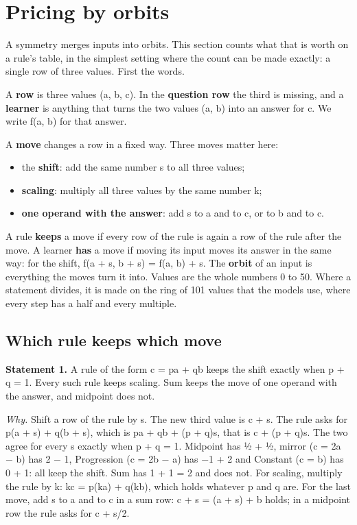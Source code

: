 \section{Pricing by orbits}\label{sec:3.6}

A symmetry merges inputs into orbits. This section counts what that is worth on a rule's table, in the simplest setting where the count can be made exactly: a single row of three values. First the words.

A \textbf{row} is three values (a, b, c). In the \textbf{question row} the third is missing, and a \textbf{learner} is anything that turns the two values (a, b) into an answer for c. We write f(a, b) for that answer.

A \textbf{move} changes a row in a fixed way. Three moves matter here:

\begin{itemize}
\item the \textbf{shift}: add the same number s to all three values;
\item \textbf{scaling}: multiply all three values by the same number k;
\item \textbf{one operand with the answer}: add s to a and to c, or to b and to c.
\end{itemize}

A rule \textbf{keeps} a move if every row of the rule is again a row of the rule after the move. A learner \textbf{has} a move if moving its input moves its answer in the same way: for the shift, f(a + s, b + s) = f(a, b) + s. The \textbf{orbit} of an input is everything the moves turn it into. Values are the whole numbers 0 to 50. Where a statement divides, it is made on the ring of 101 values that the models use, where every step has a half and every multiple.

\subsection{Which rule keeps which move}\label{sec:3.6.1}

\textbf{Statement 1.} A rule of the form c = pa + qb keeps the shift exactly when p + q = 1. Every such rule keeps scaling. Sum keeps the move of one operand with the answer, and midpoint does not.

\emph{Why.} Shift a row of the rule by s. The new third value is c + s. The rule asks for p(a + s) + q(b + s), which is pa + qb + (p + q)s, that is c + (p + q)s. The two agree for every s exactly when p + q = 1. Midpoint has ½ + ½, mirror (c = 2a − b) has 2 − 1, Progression (c = 2b − a) has −1 + 2 and Constant (c = b) has 0 + 1: all keep the shift. Sum has 1 + 1 = 2 and does not. For scaling, multiply the rule by k: kc = p(ka) + q(kb), which holds whatever p and q are. For the last move, add s to a and to c in a sum row: c + s = (a + s) + b holds; in a midpoint row the rule asks for c + s/2.

